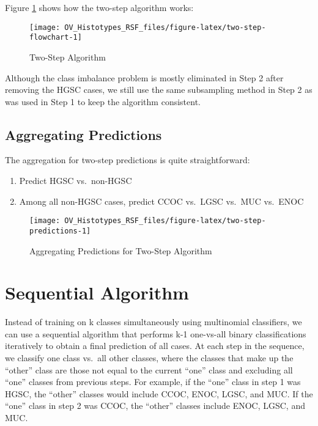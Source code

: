 \documentclass[
]{report}
\providecommand{\tightlist}{%
  \setlength{\itemsep}{0pt}\setlength{\parskip}{0pt}}
\begin{document}
Figure \ref{fig:two-step-flowchart} shows how the two-step algorithm works:

\begin{figure}[H]

{\centering \texttt{[image: OV\_Histotypes\_RSF\_files/figure-latex/two-step-flowchart-1]} 

}

\caption{Two-Step Algorithm}\label{fig:two-step-flowchart}
\end{figure}

Although the class imbalance problem is mostly eliminated in Step 2 after removing the HGSC cases, we still use the same subsampling method in Step 2 as was used in Step 1 to keep the algorithm consistent.

\subsection{Aggregating Predictions}\label{aggregating-predictions}

The aggregation for two-step predictions is quite straightforward:

\begin{enumerate}
\def\labelenumi{\arabic{enumi}.}
\tightlist
\item
  Predict HGSC vs.~non-HGSC
\item
  Among all non-HGSC cases, predict CCOC vs.~LGSC vs.~MUC vs.~ENOC
\end{enumerate}

\begin{figure}[H]

{\centering \texttt{[image: OV\_Histotypes\_RSF\_files/figure-latex/two-step-predictions-1]} 

}

\caption{Aggregating Predictions for Two-Step Algorithm}\label{fig:two-step-predictions}
\end{figure}

\section{Sequential Algorithm}\label{sequential-algorithm}

Instead of training on k classes simultaneously using multinomial classifiers, we can use a sequential algorithm that performs k-1 one-vs-all binary classifications iteratively to obtain a final prediction of all cases. At each step in the sequence, we classify one class vs.~all other classes, where the classes that make up the ``other'' class are those not equal to the current ``one'' class and excluding all ``one'' classes from previous steps. For example, if the ``one'' class in step 1 was HGSC, the ``other'' classes would include CCOC, ENOC, LGSC, and MUC. If the ``one'' class in step 2 was CCOC, the ``other'' classes include ENOC, LGSC, and MUC.
\end{document}
